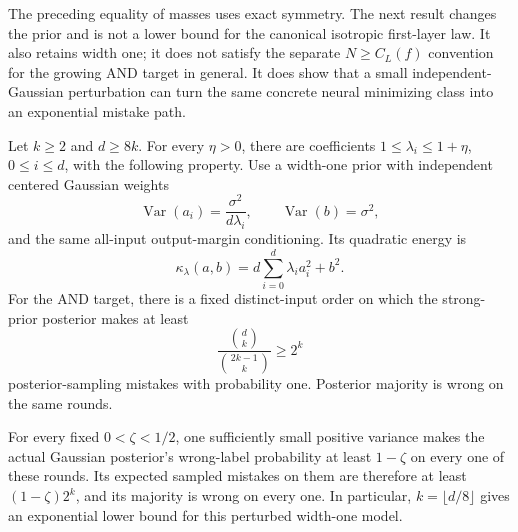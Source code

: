 The preceding equality of masses uses exact symmetry. The next result
changes the prior and is not a lower bound for the canonical isotropic
first-layer law. It also retains width one; it does not satisfy the
separate $N\ge C_L(f)$ convention for the growing AND target in general.
It does show that a small independent-Gaussian perturbation can turn the
same concrete neural minimizing class into an exponential mistake path.

\begin{proposition}
\label{prop:and-anisotropic}
Let $k\ge2$ and $d\ge8k$. For every $\eta>0$, there are coefficients
$1\le\lambda_i\le1+\eta$, $0\le i\le d$, with the following property.
Use a width-one prior with independent centered Gaussian weights
\[
 \operatorname{Var}(a_i)=\frac{\sigma^2}{d\lambda_i},\qquad
 \operatorname{Var}(b)=\sigma^2,
\]
and the same all-input output-margin conditioning. Its quadratic energy is
\[
 \kappa_\lambda(a,b)=d\sum_{i=0}^d\lambda_i a_i^2+b^2.
\]
For the AND target, there is a fixed distinct-input order on
which the strong-prior posterior makes at least
\[
 \frac{\binom d k}{\binom{2k-1}k}\ge2^k
\]
posterior-sampling mistakes with probability one. Posterior majority is
wrong on the same rounds.

For every fixed $0<\zeta<1/2$, one sufficiently small positive variance
makes the actual Gaussian posterior's wrong-label probability at least
$1-\zeta$ on every one of these rounds. Its expected sampled mistakes
on them are therefore at least $(1-\zeta)2^k$, and its majority is
wrong on every one. In particular, $k=\lfloor d/8\rfloor$ gives
an exponential lower bound for this perturbed width-one model.
\end{proposition}
